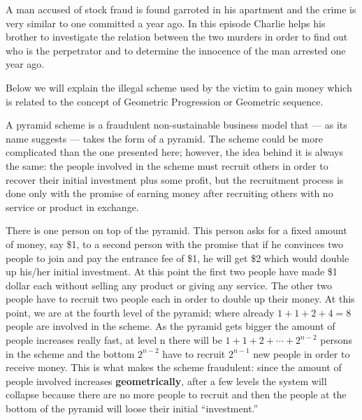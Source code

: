 \newpage
{}
{}
\setcounter{activity}{0}

A man accused of stock fraud is found garroted in his apartment and the crime is very similar to one committed a year ago. In this episode Charlie helps his brother to investigate the relation between the two murders in order to find out who is the perpetrator and to determine the innocence of the man arrested one year ago.


Below we will explain the illegal scheme used by the victim to gain money which is related to the concept of Geometric Progression or Geometric sequence.




A pyramid scheme is a fraudulent non-sustainable business model that --- as its name suggests --- takes the form of a pyramid. The scheme could be more complicated than the one presented here; however, the idea behind it is always the same: the people involved in the scheme must recruit others in order to recover their initial investment plus some profit, but the recruitment process is done only with the promise of earning money after recruiting others with no service or product in exchange.


\begin{ex}
There is one person on top of the pyramid. This person asks for a fixed amount of money, say \$1, to a second person with the promise that if he convinces two people to join and pay the entrance fee of \$1, he will get \$2 which would double up his/her initial investment. At this point the first two people have made \$1 dollar each without selling any product or giving any service. The other two people have to recruit two people each in order to double up their money. At this point, we are at the fourth level of the pyramid; where already $1+1+2+4=8$ people are involved in the scheme. As the pyramid gets bigger the amount of people increases really fast, at level n there will be $1 + 1 + 2 + \cdots + 2^{n-2}$ persons in the scheme and the bottom $2^{n-2}$ have to recruit $2^{n-1}$ new people in order to receive money. This is what makes the scheme fraudulent: since the amount of people involved increases \textbf{geometrically}, after a few levels the system will collapse because there are no more people to recruit and then the people at the bottom of the pyramid will loose their initial ``investment.''
\end{ex}

